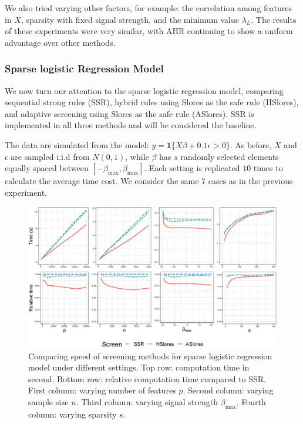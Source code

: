\documentclass[]{interact}
\theoremstyle{plain}%
\theoremstyle{definition}
\theoremstyle{remark}
\begin{document}
We also tried varying other factors, for example: the correlation among features in $X$, sparsity with fixed signal strength, and the minimum value $\lambda_L$. The results of these experiments were very similar, with AHR continuing to show a uniform advantage over other methods.

\subsubsection{Sparse logistic Regression Model}

We now turn our attention to the sparse logistic regression model, comparing sequential strong rules (SSR), hybrid rules using Slores as the safe rule (HSlores), and adaptive screening using Slores as the safe rule (ASlores). SSR is implemented in all three methods and will be considered the baseline.

The data are simulated from the model: $y=\mathbf{1}\{X\beta+0.1\epsilon >0\}$. As before, $X$ and $\epsilon$ are sampled i.i.d from $N(0,1)$, while $\beta$ has $s$ randomly selected elements equally spaced between $[-\beta_{\max},\beta_{\max}]$. Each setting is replicated $10$ times to calculate the average time cost. We consider the same 7 cases as in the previous experiment.

\begin{figure}[h]
    \centering
    \includegraphics[width=\textwidth]{512.eps}    \caption{Comparing speed of screening methods for sparse logistic regression model under different settings. Top row: computation time in second. Bottom row: relative computation time compared to SSR. First column: varying number of features $p$. Second column: varying sample size $n$. Third column: varying signal strength $\beta_{\max}$. Fourth column: varying sparsity $s$.}
    \label{fig:5.1.2a}
\end{figure}
\end{document}
